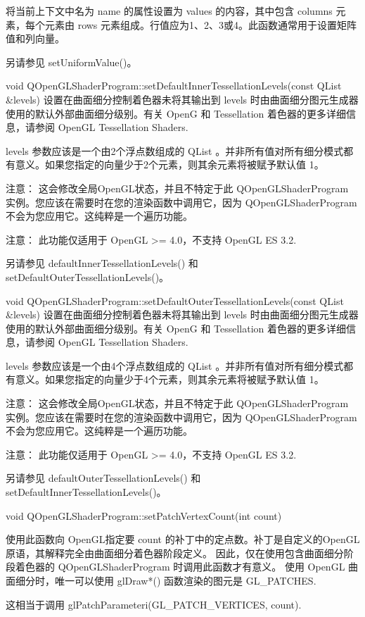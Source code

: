 将当前上下文中名为 name 的属性设置为 values 的内容，其中包含 columns 元素，每个元素由 rows 元素组成。行值应为1、2、3或4。此函数通常用于设置矩阵值和列向量。

另请参见 setUniformValue()。

void QOpenGLShaderProgram::setDefaultInnerTessellationLevels(const QList \&levels)
设置在曲面细分控制着色器未将其输出到 levels 时由曲面细分图元生成器使用的默认外部曲面细分级别。有关 OpenG 和 Tessellation 着色器的更多详细信息，请参阅 OpenGL Tessellation Shaders.

levels 参数应该是一个由2个浮点数组成的 QList 。并非所有值对所有细分模式都有意义。如果您指定的向量少于2个元素，则其余元素将被赋予默认值 1。

注意： 这会修改全局OpenGL状态，并且不特定于此 QOpenGLShaderProgram 实例。您应该在需要时在您的渲染函数中调用它，因为 QOpenGLShaderProgram 不会为您应用它。这纯粹是一个遍历功能。

注意： 此功能仅适用于 OpenGL >= 4.0，不支持 OpenGL ES 3.2.

另请参见 defaultInnerTessellationLevels() 和 setDefaultOuterTessellationLevels()。

void QOpenGLShaderProgram::setDefaultOuterTessellationLevels(const QList \&levels)
设置在曲面细分控制着色器未将其输出到 levels 时由曲面细分图元生成器使用的默认外部曲面细分级别。有关 OpenG 和 Tessellation 着色器的更多详细信息，请参阅 OpenGL Tessellation Shaders.

levels 参数应该是一个由4个浮点数组成的 QList 。并非所有值对所有细分模式都有意义。如果您指定的向量少于4个元素，则其余元素将被赋予默认值 1。

注意： 这会修改全局OpenGL状态，并且不特定于此 QOpenGLShaderProgram 实例。您应该在需要时在您的渲染函数中调用它，因为 QOpenGLShaderProgram 不会为您应用它。这纯粹是一个遍历功能。

注意： 此功能仅适用于 OpenGL >= 4.0，不支持 OpenGL ES 3.2.

另请参见 defaultOuterTessellationLevels() 和 setDefaultInnerTessellationLevels()。

void QOpenGLShaderProgram::setPatchVertexCount(int count)

使用此函数向 OpenGL指定要 count 的补丁中的定点数。补丁是自定义的OpenGL原语，其解释完全由曲面细分着色器阶段定义。 因此，仅在使用包含曲面细分阶段着色器的 QOpenGLShaderProgram 时调用此函数才有意义。 使用 OpenGL 曲面细分时，唯一可以使用 glDraw*() 函数渲染的图元是 GL\_PATCHES.

这相当于调用 glPatchParameteri(GL\_PATCH\_VERTICES, count).

